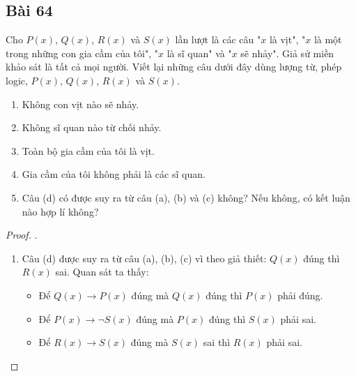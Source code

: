 \subsection*{Bài 64}
Cho $P(x)$, $Q(x)$, $R(x)$ và $S(x)$ lần lượt là các câu "$x$ là vịt", "$x$ là một trong những con gia cầm của tôi", "$x$ là sĩ quan" và "$x$ sẽ nhảy". Giả sử miền khảo sát là tất cả mọi người. Viết lại những câu dưới đây dùng lượng từ, phép logic, $P(x)$, $Q(x)$, $R(x)$ và $S(x)$.
\begin{enumerate}[label=\alph*)]
    \item Không con vịt nào sẽ nhảy.
    \item Không sĩ quan nào từ chối nhảy.
    \item Toàn bộ gia cầm của tôi là vịt.
    \item Gia cầm của tôi không phải là các sĩ quan.
    \item Câu (d) có được suy ra từ câu (a), (b) và (c) không? Nếu không, có kết luận nào hợp lí không?
\end{enumerate}
\begin{proof}.
    \begin{enumerate}[label=\alph*)]
        \item Câu (d) được suy ra từ câu (a), (b), (c) vì theo giả thiết: $Q(x)$ đúng thì $R(x)$ sai. Quan sát ta thấy:
        \begin{itemize}
            \item Để $Q(x)\rightarrow P(x)$ đúng mà $Q(x)$ đúng thì $P(x)$ phải đúng.
            \item Để $P(x)\rightarrow \neg S(x)$ đúng mà $P(x)$ đúng thì $S(x)$ phải sai.
            \item Để $R(x)\rightarrow S(x)$ đúng mà $S(x)$ sai thì $R(x)$ phải sai.
        \end{itemize}
    \end{enumerate}
\end{proof}